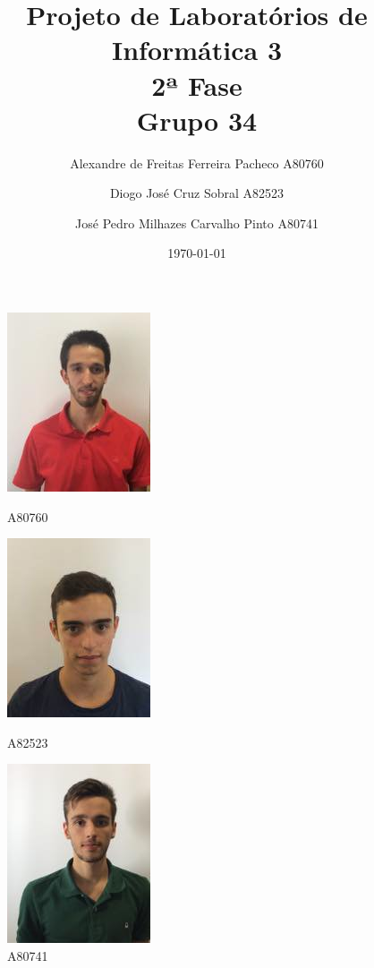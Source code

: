 \documentclass[10pt]{article}
\begin{document}
\title{Projeto de Laboratórios de Informática 3\\2ª Fase\\Grupo 34}
\author{Alexandre de Freitas Ferreira Pacheco A80760\and Diogo José Cruz Sobral A82523\and José Pedro Milhazes Carvalho Pinto A80741}


\date{\today}


\maketitle

\begin{figure}[h]
	\centering
		\includegraphics[scale=0.5]{A80760.png}
		\caption{A80760}
		\label{fig1:A80760}
	\endminipage\hfill
	\centering
		\includegraphics[scale=0.5]{A82523.jpg}
		\caption{A82523}
		\label{fig2:A82523}
	\endminipage\hfill
	\centering
		\includegraphics[scale=0.5]{A80741.jpeg}
		\caption{A80741}
		\label{fig3:A80741}
	\endminipage
\end{figure}
\end{document}
